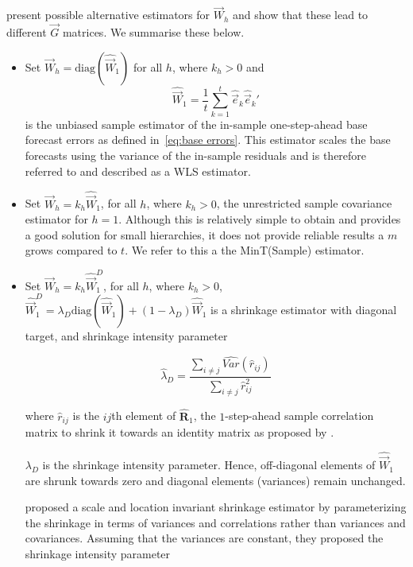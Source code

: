 \documentclass[graybox]{svmult}
\begin{document}
\citet{WicEtAl2019} present possible alternative estimators for ${\vec{W}}_{h}$ and show that these lead to different $\vec{G}$ matrices. We summarise these below. 

\begin{itemize}
    \item Set ${\vec{W}}_{h}=\text{diag}(\hat{\vec{W}}_{1})$ for all $h$, where $k_{h} > 0$ and
        $$
        \hat{\vec{W}}_{1} = \frac{1}{t}\sum_{k=1}^{t} \hat{\vec{e}}_{k}\hat{\vec{e}}_{k}'
        $$
        is the unbiased sample estimator of the in-sample one-step-ahead base forecast errors as defined in~\eqref{eq:base errors}. This estimator scales the base forecasts using the variance of the in-sample residuals and is therefore referred to and described as a WLS estimator.
    \item  Set $\vec{W}_{h}=k_{h}\hat{\vec{W}}_{1}$, for all $h$, where $k_{h} > 0$, the unrestricted sample covariance estimator for $h=1$. Although this is relatively simple to obtain and provides a good solution for small hierarchies, it does not provide reliable results a $m$ grows compared to $t$. We refer to this a the MinT(Sample) estimator.
    \item Set $\vec{W}_{h}=k_{h}\hat{\vec{W}}_{1}^D$, for all $h$, where $k_{h} > 0$, $\hat{\vec{W}}^{D}_{1} = \lambda_{D} \text{diag}(\hat{\vec{W}}_{1}) + (1 - \lambda_{D})\hat{\vec{W}}_{1}$ is a shrinkage estimator with diagonal target, and shrinkage intensity parameter
        
        $$\hat{\lambda}_{D} = \frac{\sum_{i \ne j}\hat{Var}(\hat{r}_{ij})}{\sum_{i \ne j}\hat{r}_{ij}^2}$$
        
        
        where $\hat{r}_{ij}$ is the $ij$th element of $\hat{\bm{R}}_{1}$, the $1$-step-ahead sample correlation matrix to shrink it towards an identity matrix as proposed by \citet{Schafer2005}.
        
        $\lambda_{D}$ is the shrinkage intensity parameter. Hence, off-diagonal elements of $\hat{\vec{W}}_1$ are shrunk towards zero and diagonal elements (variances) remain unchanged.
        
         \citet{Schafer2005} proposed a scale and location invariant shrinkage estimator by parameterizing the shrinkage in terms of variances and correlations rather than variances and covariances. Assuming that the variances are constant, they proposed the shrinkage intensity parameter
         
\end{itemize}
\end{document}
